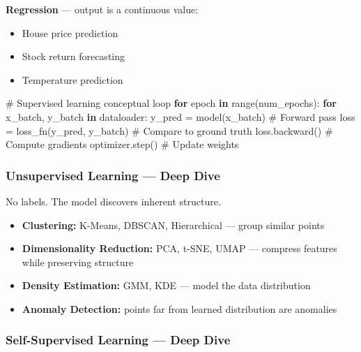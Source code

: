 \documentclass[11pt]{article}
\providecommand{\tightlist}{\setlength{\itemsep}{1pt}\setlength{\parskip}{0pt}}
\newenvironment{Shaded}{\begin{snugshade}}{\end{snugshade}}
\newcommand{\BuiltInTok}[1]{\textcolor[rgb]{0.50,0.55,0.55}{#1}}
\newcommand{\CommentTok}[1]{\textcolor[rgb]{0.48,0.49,0.49}{#1}}
\newcommand{\ControlFlowTok}[1]{\textcolor[rgb]{0.99,0.74,0.29}{\textbf{#1}}}
\newcommand{\KeywordTok}[1]{\textcolor[rgb]{0.81,0.81,0.76}{\textbf{#1}}}
\newcommand{\NormalTok}[1]{\textcolor[rgb]{0.81,0.81,0.76}{#1}}
\newcommand{\OperatorTok}[1]{\textcolor[rgb]{0.81,0.81,0.76}{#1}}
\begin{document}
\textbf{Regression} --- output is a continuous value:

\begin{itemize}
\tightlist
\item
  House price prediction
\item
  Stock return forecasting
\item
  Temperature prediction
\end{itemize}


\begin{Shaded}
\begin{Highlighting}[]
\CommentTok{\# Supervised learning conceptual loop}
\ControlFlowTok{for}\NormalTok{ epoch }\KeywordTok{in} \BuiltInTok{range}\NormalTok{(num\_epochs):}
    \ControlFlowTok{for}\NormalTok{ x\_batch, y\_batch }\KeywordTok{in}\NormalTok{ dataloader:}
\NormalTok{        y\_pred }\OperatorTok{=}\NormalTok{ model(x\_batch)          }\CommentTok{\# Forward pass}
\NormalTok{        loss }\OperatorTok{=}\NormalTok{ loss\_fn(y\_pred, y\_batch)  }\CommentTok{\# Compare to ground truth}
\NormalTok{        loss.backward()                  }\CommentTok{\# Compute gradients}
\NormalTok{        optimizer.step()                 }\CommentTok{\# Update weights}
\end{Highlighting}
\end{Shaded}

\subsubsection{Unsupervised Learning --- Deep Dive}\label{unsupervised-learning--deep-dive}

No labels. The model discovers inherent structure.

\begin{itemize}
\tightlist
\item
  \textbf{Clustering:} K-Means, DBSCAN, Hierarchical --- group similar points
\item
  \textbf{Dimensionality Reduction:} PCA, t-SNE, UMAP --- compress features while preserving structure
\item
  \textbf{Density Estimation:} GMM, KDE --- model the data distribution
\item
  \textbf{Anomaly Detection:} points far from learned distribution are anomalies
\end{itemize}

\subsubsection{Self-Supervised Learning --- Deep Dive}\label{self-supervised-learning--deep-dive}
\end{document}
